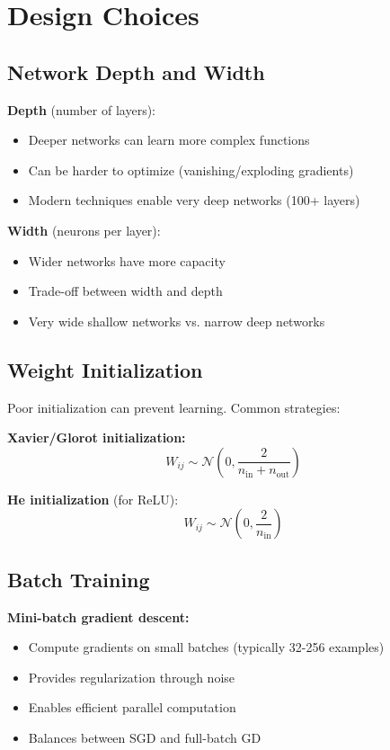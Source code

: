 
\section{Design Choices}
\label{sec:design-choices}

\subsection{Network Depth and Width}

\textbf{Depth} (number of layers):
\begin{itemize}
    \item Deeper networks can learn more complex functions
    \item Can be harder to optimize (vanishing/exploding gradients)
    \item Modern techniques enable very deep networks (100+ layers)
\end{itemize}

\textbf{Width} (neurons per layer):
\begin{itemize}
    \item Wider networks have more capacity
    \item Trade-off between width and depth
    \item Very wide shallow networks vs. narrow deep networks
\end{itemize}

\subsection{Weight Initialization}

Poor initialization can prevent learning. Common strategies:

\textbf{Xavier/Glorot initialization:}
\begin{equation}
W_{ij} \sim \mathcal{N}\left(0, \frac{2}{n_{\text{in}} + n_{\text{out}}}\right)
\end{equation}

\textbf{He initialization} (for ReLU):
\begin{equation}
W_{ij} \sim \mathcal{N}\left(0, \frac{2}{n_{\text{in}}}\right)
\end{equation}

\subsection{Batch Training}

\textbf{Mini-batch gradient descent:}
\begin{itemize}
    \item Compute gradients on small batches (typically 32-256 examples)
    \item Provides regularization through noise
    \item Enables efficient parallel computation
    \item Balances between SGD and full-batch GD
\end{itemize}
